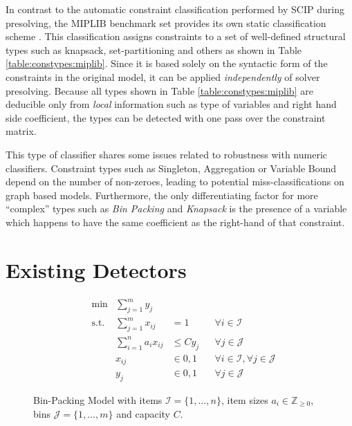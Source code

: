 				In contrast to the automatic constraint classification performed by SCIP during presolving, the MIPLIB benchmark set provides its own static classification scheme \cite{gleixnerMIPLIB2017Datadriven2021a}. This classification assigns constraints to a set of well-defined structural types such as knapsack, set-partitioning and others as shown in Table \ref{table:constypes:miplib}. Since it is based solely on the syntactic form of the constraints in the original model, it can be applied \textit{independently} of solver presolving.
				Because all types shown in Table \ref{table:constypes:miplib} are deducible only from \textit{local} information such as type of variables and right hand side coefficient, the types can be detected with one pass over the constraint matrix.
				
				This type of classifier shares some issues related to robustness with numeric classifiers.
				Constraint types such as Singleton, Aggregation or Variable Bound depend on the number of non-zeroes, leading to potential miss-classifications on graph based models.
				Furthermore, the only differentiating factor for more \enquote{complex} types such as \textit{Bin Packing} and \textit{Knapsack} is the presence of a variable which happens to have the same coefficient as the right-hand of that constraint.
	
	\section{Existing Detectors}
	
		\begin{figure}[ht!]
			\centering
			\begin{align}
				&\min &\sum_{j=1}^m y_j \nonumber \\
				&\text{s.t.} &\sum_{j=1}^m x_{ij} &= 1 &&\forall i \in \mathcal{I} \label{eq:gcg:example:link} \\
				&& \sum_{i=1}^n a_i x_{ij} &\leq C y_j && \forall j \in \mathcal{J} \label{eq:gcg:example:capacity} \\
				&& x_{ij} &\in { 0, 1 } && \forall i \in \mathcal{I}, \forall j \in \mathcal{J} \nonumber \\
				&& y_j &\in { 0, 1 } && \forall j \in \mathcal{J} \nonumber
			\end{align}
			\caption{Bin-Packing Model with items $\mathcal{I} = \{ 1, \ldots, n \}$, item sizes $a_i \in \mathbb{Z}_{\geq 0}$, bins $\mathcal{J} = \{ 1, \ldots, m \}$ and capacity $C$.}
			\label{figure:gcg:example:binpack}
		\end{figure}
	

